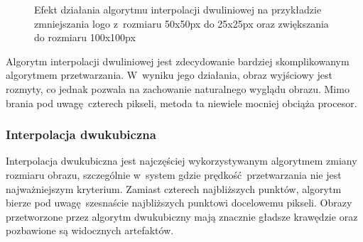 \begin{figure}[h]
    \centering
    \qquad
    \qquad
    \caption{Efekt działania algorytmu interpolacji dwuliniowej na przykładzie zmniejszania logo \bk z~rozmiaru 50x50px do 25x25px oraz zwiększania do rozmiaru 100x100px}
    \label{fig:bilinear-result}
\end{figure}

Algorytm interpolacji dwuliniowej jest zdecydowanie bardziej skomplikowanym algorytmem przetwarzania. W~wyniku jego działania, obraz wyjściowy jest rozmyty, co jednak pozwala na zachowanie naturalnego wyglądu obrazu. Mimo brania pod uwagę czterech pikseli, metoda ta niewiele mocniej obciąża procesor. 

\subsubsection{Interpolacja dwukubiczna}
Interpolacja dwukubiczna jest najczęściej wykorzystywanym algorytmem zmiany rozmiaru obrazu, szczególnie w~system gdzie prędkość przetwarzania nie jest najważniejszym kryterium. Zamiast czterech najbliższych punktów, algorytm bierze pod uwagę szesnaście najbliższych punktowi docelowemu pikseli. Obrazy przetworzone przez algorytm dwukubiczny mają znacznie gładsze krawędzie oraz pozbawione są widocznych artefaktów.

